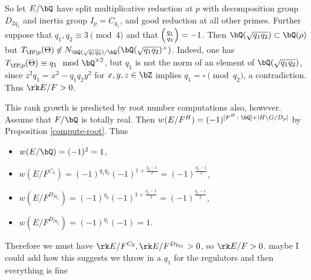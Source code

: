 \begin{example}[Dihedral]
    So let $E / \bQ$ have split multiplicative reduction at $p$ with decomposition group $D_{2 q_1}$ and inertia group $I_p = C_{q_1}$, and good reduction at all other primes. Further suppose that $q_1, q_2 \equiv 3 \pmod 4$ and that $\left( \frac{q_1}{q_2} \right)  = -1$. Then $\bQ(\sqrt{q_1 q_2}) \subset \bQ(\rho)$ but $T_{\fP \mid p}(\Theta) \not\in N_{\bQ(\sqrt{q_1 q_2}) / \bQ}(\bQ(\sqrt{q_1 q_2})^{\times})$. Indeed, one has $T_{\fP \mid p}(\Theta) \equiv q_1 \mod \bQ^{\times 2}$, but $q_1$ is not the norm of an element of $\bQ(\sqrt{q_1 q_2})$, since $z^2 q_1 = x^2 - q_1q_2 y^2$ for $x,y,z \in \bZ$ implies $q_1 = \square \pmod {q_2}$, a contradiction. Thus $\rk E / F > 0$.

    This rank growth is predicted by root number computations also, however. Assume that $F / \bQ$ is totally real. Then $w(E / F^H) = (-1)^{[F^H \colon \bQ] + | H \backslash G / D_p|}$ by Proposition \ref{compute-root}. Thus
    \begin{itemize}[--]
        \setlength\itemsep{0em}
        \item $w(E / \bQ) = (-1)^2 = 1$,
        \item $w(E / F^{C_2}) = (-1)^{q_1 q_2} (-1)^{1 + \frac{q_2 - 1}{2}} = (-1)^{\frac{q_2 - 1}{2}}$,
        \item $w(E / F^{D_{2 q_1}}) = (-1)^{q_2}(-1)^{1 + \frac{q_2 - 1}{2}} = (-1)^{\frac{q_2 - 1}{2}},$
        \item $w(E / F^{D_{2 q_2}}) = (-1)^{q_1}(-1) = 1$. 
    \end{itemize}
    Therefore we must have $\rk E / F^{C_2}, \rk E / F^{D_{2q_1}} > 0$, so $\rk E / F > 0$. {\color{red} maybe I could add how this suggests we throw in a $q_1$ for the regulators and then everything is fine }
\end{example}

\begin{example}



\end{example}